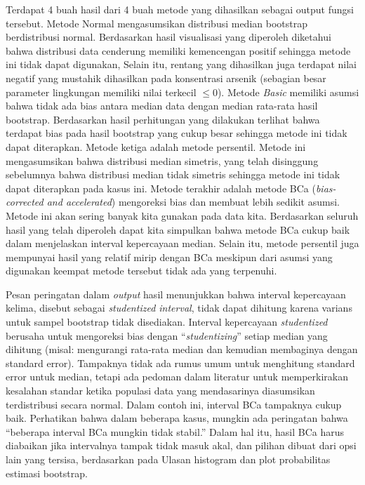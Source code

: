 \documentclass[]{book}
\begin{document}
Terdapat 4 buah hasil dari 4 buah metode yang dihasilkan sebagai output
fungsi tersebut. Metode Normal mengasumsikan distribusi median bootstrap
berdistribusi normal. Berdasarkan hasil visualisasi yang diperoleh
diketahui bahwa distribusi data cenderung memiliki kemencengan positif
sehingga metode ini tidak dapat digunakan, Selain itu, rentang yang
dihasilkan juga terdapat nilai negatif yang mustahik dihasilkan pada
konsentrasi arsenik (sebagian besar parameter lingkungan memiliki nilai
terkecil \(\le0\)). Metode \emph{Basic} memiliki asumsi bahwa tidak ada
bias antara median data dengan median rata-rata hasil bootstrap.
Berdasarkan hasil perhitungan yang dilakukan terlihat bahwa terdapat
bias pada hasil bootstrap yang cukup besar sehingga metode ini tidak
dapat diterapkan. Metode ketiga adalah metode persentil. Metode ini
mengasumsikan bahwa distribusi median simetris, yang telah disinggung
sebelumnya bahwa distribusi median tidak simetris sehingga metode ini
tidak dapat diterapkan pada kasus ini. Metode terakhir adalah metode BCa
(\emph{bias-corrected and accelerated}) mengoreksi bias dan membuat
lebih sedikit asumsi. Metode ini akan sering banyak kita gunakan pada
data kita. Berdasarkan seluruh hasil yang telah diperoleh dapat kita
simpulkan bahwa metode BCa cukup baik dalam menjelaskan interval
kepercayaan median. Selain itu, metode persentil juga mempunyai hasil
yang relatif mirip dengan BCa meskipun dari asumsi yang digunakan
keempat metode tersebut tidak ada yang terpenuhi.

Pesan peringatan dalam \emph{output} hasil menunjukkan bahwa interval
kepercayaan kelima, disebut sebagai \emph{studentized interval}, tidak
dapat dihitung karena varians untuk sampel bootstrap tidak disediakan.
Interval kepercayaan \emph{studentized} berusaha untuk mengoreksi bias
dengan ``\emph{studentizing}'' setiap median yang dihitung (misal:
mengurangi rata-rata median dan kemudian membaginya dengan standard
error). Tampaknya tidak ada rumus umum untuk menghitung standard error
untuk median, tetapi ada pedoman dalam literatur untuk memperkirakan
kesalahan standar ketika populasi data yang mendasarinya diasumsikan
terdistribusi secara normal. Dalam contoh ini, interval BCa tampaknya
cukup baik. Perhatikan bahwa dalam beberapa kasus, mungkin ada
peringatan bahwa ``beberapa interval BCa mungkin tidak stabil.'' Dalam
hal itu, hasil BCa harus diabaikan jika intervalnya tampak tidak masuk
akal, dan pilihan dibuat dari opsi lain yang tersisa, berdasarkan pada
Ulasan histogram dan plot probabilitas estimasi bootstrap.
\end{document}
